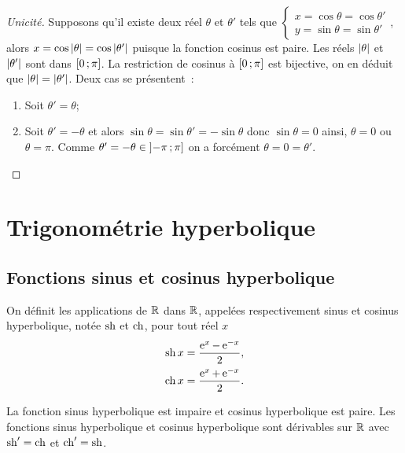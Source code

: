 \begin{proof}[Unicité]
  Supposons qu'il existe deux réel \(\theta\) et \(\theta'\) tels que
  \(\begin{cases} x = \cos \theta = \cos \theta' \\ y = \sin \theta = \sin
  \theta' \end{cases}\), alors \(x = \cos \left\lvert\theta\right\rvert = \cos \left\lvert\theta'\right\rvert\)
  puisque la fonction cosinus est paire. Les réels \(\left\lvert\theta\right\rvert\) et
  \(\left\lvert\theta'\right\rvert\) sont dans \(\left[ 0 \, ; {} \pi \right]\). La restriction de
  cosinus à \(\left[ 0 \, ; {} \pi \right]\) est bijective, on en déduit que
  \(\left\lvert\theta\right\rvert = \left\lvert\theta'\right\rvert\). Deux cas se présentent~:
  \begin{enumerate}
    \item Soit \(\theta' = \theta\);
    \item Soit \(\theta' = -\theta\) et alors \(\sin \theta = \sin \theta' =
      -\sin \theta\) donc \(\sin \theta = 0\) ainsi, \(\theta = 0\) ou \(\theta
      = \pi\). Comme \(\theta' = -\theta \in \left] -\pi \, ; {} \pi \right]\) on a
      forcément \(\theta = 0 = \theta'\).
  \end{enumerate}
\end{proof}

\section{Trigonométrie hyperbolique}\label{sec:chap1-trigohyper}

\subsection{Fonctions sinus et cosinus
hyperbolique}\label{subsec:chap1-sinushetcosh}

\begin{defdef}
  On définit les applications de \(\mathbb{R}\) dans \(\mathbb{R}\), appelées respectivement
  sinus et cosinus hyperbolique, notée \(\operatorname{sh}\) et \(\operatorname{ch}\), pour tout réel
  \(x\)
  \begin{align*}
    \operatorname{sh}{x} &= \frac{\operatorname{e}^x-\operatorname{e}^{-x}}{2}, \\
    \operatorname{ch}{x} &= \frac{\operatorname{e}^x+\operatorname{e}^{-x}}{2}.
  \end{align*}
\end{defdef}

\begin{prop}
  La fonction sinus hyperbolique est impaire et cosinus hyperbolique est paire.
  Les fonctions sinus hyperbolique et cosinus hyperbolique sont dérivables sur
  \(\mathbb{R}\) avec \(\operatorname{sh}' = \operatorname{ch}\) et \(\operatorname{ch}' = \operatorname{sh}\).
\end{prop}

